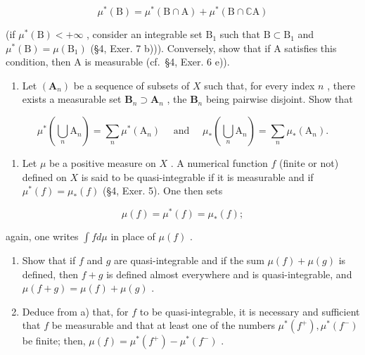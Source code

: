 \[
\mu^ {*} (\mathrm{B}) = \mu^ {*} (\mathrm{B} \cap \mathrm{A}) + \mu^ {*} (\mathrm{B} \cap \mathbb {C} \mathrm{A})
\]

(if \(\mu^{*}(\mathrm{B}) < +\infty\) , consider an integrable set \(\mathrm{B}_{1}\) such that \(\mathrm{B} \subset \mathrm{B}_{1}\) and \(\mu^{*}(\mathrm{B}) = \mu(\mathrm{B}_{1})\) (§4, Exer. 7 b))). Conversely, show that if A satisfies this condition, then A is measurable (cf.~§4, Exer. 6 e)).

\begin{enumerate}
\def\labelenumi{\arabic{enumi})}
\setcounter{enumi}{13}
\tightlist
\item
  Let \((\mathbf{A}_n)\) be a sequence of subsets of \(X\) such that, for every index \(n\) , there exists a measurable set \(\mathbf{B}_n \supset \mathbf{A}_n\) , the \(\mathbf{B}_n\) being pairwise disjoint. Show that
\end{enumerate}

\[
\mu^ {*} \left(\bigcup_ {n} \mathrm{A} _ {n}\right) = \sum_ {n} \mu^ {*} (\mathrm{A} _ {n}) \quad \text { and } \quad \mu_ {*} \left(\bigcup_ {n} \mathrm{A} _ {n}\right) = \sum_ {n} \mu_ {*} (\mathrm{A} _ {n}).
\]

\begin{enumerate}
\def\labelenumi{\arabic{enumi})}
\setcounter{enumi}{14}
\tightlist
\item
  Let \(\mu\) be a positive measure on \(X\) . A numerical function \(f\) (finite or not) defined on \(X\) is said to be quasi-integrable if it is measurable and if \(\mu^{*}(f) = \mu_{*}(f)\) (§4, Exer. 5). One then sets
\end{enumerate}

\[
\mu (f) = \mu^ {*} (f) = \mu_ {*} (f);
\]

again, one writes \(\int f d\mu\) in place of \(\mu(f)\) .

\begin{enumerate}
\def\labelenumi{\alph{enumi})}
\item
  Show that if \(f\) and \(g\) are quasi-integrable and if the sum \(\mu(f) + \mu(g)\) is defined, then \(f + g\) is defined almost everywhere and is quasi-integrable, and \(\mu(f + g) = \mu(f) + \mu(g)\) .
\item
  Deduce from a) that, for \(f\) to be quasi-integrable, it is necessary and sufficient that \(f\) be measurable and that at least one of the numbers \(\mu^{*}(f^{+}), \mu^{*}(f^{-})\) be finite; then, \(\mu(f) = \mu^{*}(f^{+}) - \mu^{*}(f^{-})\) .
\end{enumerate}

